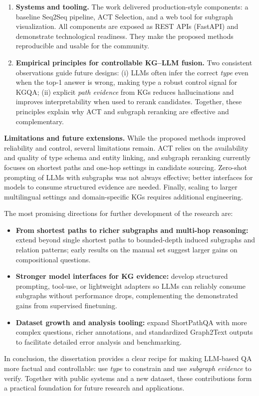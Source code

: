 \begin{enumerate}
    \item \textbf{Systems and tooling.} The work delivered production-style components: a baseline Seq2Seq pipeline, ACT Selection, and a web tool for subgraph visualization. All components are exposed as REST APIs (FastAPI) and demonstrate technological readiness. They make the proposed methods reproducible and usable for the community.
    
    \item \textbf{Empirical principles for controllable KG–LLM fusion.} Two consistent observations guide future designs: (i) LLMs often infer the correct \emph{type} even when the top-1 answer is wrong, making type a robust control signal for KGQA; (ii) explicit \emph{path evidence} from KGs reduces hallucinations and improves interpretability when used to rerank candidates. Together, these principles explain why ACT and subgraph reranking are effective and complementary.
\end{enumerate}

\noindent\textbf{Limitations and future extensions.} While the proposed methods improved reliability and control, several limitations remain. ACT relies on the availability and quality of type schema and entity linking, and subgraph reranking currently focuses on shortest paths and one-hop settings in candidate sourcing. Zero-shot prompting of LLMs with subgraphs was not always effective; better interfaces for models to consume structured evidence are needed. Finally, scaling to larger multilingual settings and domain-specific KGs requires additional engineering.

The most promising directions for further development of the research are:
\begin{itemize}
    \item \textbf{From shortest paths to richer subgraphs and multi-hop reasoning:} extend beyond single shortest paths to bounded-depth induced subgraphs and relation patterns; early results on the manual set suggest larger gains on compositional questions.
    \item \textbf{Stronger model interfaces for KG evidence:} develop structured prompting, tool-use, or lightweight adapters so LLMs can reliably consume subgraphs without performance drops, complementing the demonstrated gains from supervised finetuning.
    \item \textbf{Dataset growth and analysis tooling:} expand ShortPathQA with more complex questions, richer annotations, and standardized Graph2Text outputs to facilitate detailed error analysis and benchmarking.
\end{itemize}

\noindent In conclusion, the dissertation provides a clear recipe for making LLM-based QA more factual and controllable: use \emph{type} to constrain and use \emph{subgraph evidence} to verify. Together with public systems and a new dataset, these contributions form a practical foundation for future research and applications.

